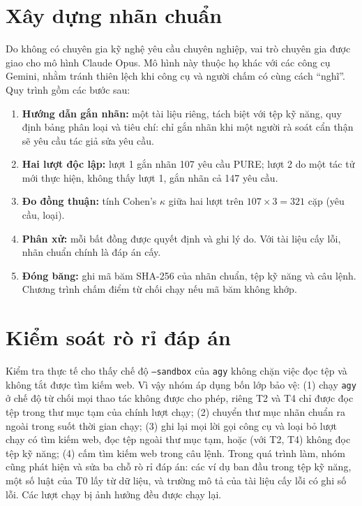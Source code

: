 \documentclass[12pt,a4paper]{report}
\begin{document}
\section{Xây dựng nhãn chuẩn}
Do không có chuyên gia kỹ nghệ yêu cầu chuyên nghiệp, vai trò chuyên gia được giao cho mô hình Claude Opus. Mô hình này thuộc họ khác với các công cụ Gemini, nhằm tránh thiên lệch khi công cụ và người chấm có cùng cách ``nghĩ''. Quy trình gồm các bước sau:
\begin{enumerate}
  \item \textbf{Hướng dẫn gắn nhãn:} một tài liệu riêng, tách biệt với tệp kỹ năng, quy định bảng phân loại và tiêu chí: chỉ gắn nhãn khi một người rà soát cẩn thận sẽ yêu cầu tác giả sửa yêu cầu.
  \item \textbf{Hai lượt độc lập:} lượt 1 gắn nhãn 107 yêu cầu PURE; lượt 2 do một tác tử mới thực hiện, không thấy lượt 1, gắn nhãn cả 147 yêu cầu.
  \item \textbf{Đo đồng thuận:} tính Cohen's $\kappa$ giữa hai lượt trên $107 \times 3 = 321$ cặp (yêu cầu, loại).
  \item \textbf{Phân xử:} mỗi bất đồng được quyết định và ghi lý do. Với tài liệu cấy lỗi, nhãn chuẩn chính là đáp án cấy.
  \item \textbf{Đóng băng:} ghi mã băm SHA-256 của nhãn chuẩn, tệp kỹ năng và câu lệnh. Chương trình chấm điểm từ chối chạy nếu mã băm không khớp.
\end{enumerate}

\section{Kiểm soát rò rỉ đáp án}
\label{sec:leak}
Kiểm tra thực tế cho thấy chế độ \texttt{--sandbox} của \texttt{agy} không chặn việc đọc tệp và không tắt được tìm kiếm web. Vì vậy nhóm áp dụng bốn lớp bảo vệ: (1) chạy \texttt{agy} ở chế độ từ chối mọi thao tác không được cho phép, riêng T2 và T4 chỉ được đọc tệp trong thư mục tạm của chính lượt chạy; (2) chuyển thư mục nhãn chuẩn ra ngoài trong suốt thời gian chạy; (3) ghi lại mọi lời gọi công cụ và loại bỏ lượt chạy có tìm kiếm web, đọc tệp ngoài thư mục tạm, hoặc (với T2, T4) không đọc tệp kỹ năng; (4) cấm tìm kiếm web trong câu lệnh. Trong quá trình làm, nhóm cũng phát hiện và sửa ba chỗ rò rỉ đáp án: các ví dụ ban đầu trong tệp kỹ năng, một số luật của T0 lấy từ dữ liệu, và trường mô tả của tài liệu cấy lỗi có ghi số lỗi. Các lượt chạy bị ảnh hưởng đều được chạy lại.
\end{document}
